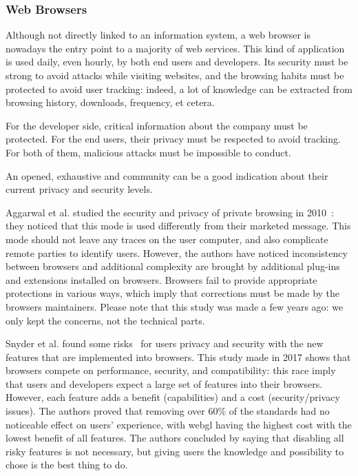 \subsubsection{Web Browsers}
\label{subsubsec:state_review_results_webbrowsers}

Although not directly linked to an information system, a web browser is nowadays the entry point to a majority of web services. This kind of application is used daily, even hourly, by both end users and developers. Its security must be strong to avoid attacks while visiting websites, and the browsing habits must be protected to avoid user tracking: indeed, a lot of knowledge can be extracted from browsing history, downloads, frequency, et cetera.

For the developer side, critical information about the company must be protected. For the end users, their privacy must be respected to avoid tracking. For both of them, malicious attacks must be impossible to conduct. 

An opened, exhaustive and community  can be a good indication about their current privacy and security levels.

Aggarwal et al. studied the security and privacy of private browsing in 2010~\cite{aggarwal_analysis_2010}: they noticed that this mode is used differently from their marketed message. This mode should not leave any traces on the user computer, and also complicate remote parties to identify users. However, the authors have noticed inconsistency between browsers and additional complexity are brought by additional plug-ins and extensions installed on browsers. Browsers fail to provide appropriate protections in various ways, which imply that corrections must be made by the browsers maintainers. Please note that this study was made a few years ago: we only kept the concerns, not the technical parts. %

Snyder et al. found some risks~\cite{snyder_most_2017} for users privacy and security with the new features that are implemented into browsers. This study made in 2017 shows that browsers compete on performance, security, and compatibility: this race imply that users and developers expect a large set of features into their browsers. However, each feature adds a benefit (capabilities) and a cost (security/privacy issues). The authors proved that removing over 60\% of the standards had no noticeable effect on users' experience, with \gls{webgl} having the highest cost with the lowest benefit of all features. The authors concluded by saying that disabling all risky features is not necessary, but giving users the knowledge and possibility to chose is the best thing to do. %

